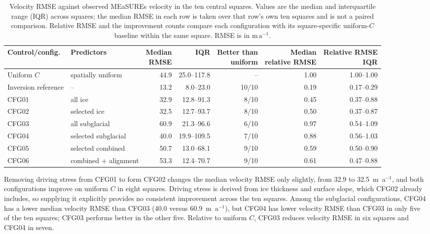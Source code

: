 \documentclass[review,jog]{igs}
\providecommand{\toprule}{\hline}
\providecommand{\midrule}{\hline}
\providecommand{\bottomrule}{\hline}
\begin{document}
\begin{table}
\caption{Velocity RMSE against observed MEaSUREs velocity in the ten central
squares. Values are the median and interquartile range (IQR) across squares; the median RMSE in each row is taken over that row's own ten squares and is not a paired comparison. Relative RMSE and the improvement counts compare each configuration with its square-specific uniform-$C$ baseline within the same square. RMSE is in
$\mathrm{m\,a^{-1}}$.}
\label{tab:performance_summary}
\centering\small
\ifdefined\FinalPass\setlength{\tabcolsep}{4pt}\fi
\begin{tabular}{llrrrrr}
\toprule
Control/config. & Predictors & \shortstack{Median\\RMSE} & IQR & \shortstack{Better than\\uniform} & \shortstack{Median\\relative RMSE} & \shortstack{Relative RMSE\\IQR}\\
\midrule
Uniform $C$ & spatially uniform & 44.9 & 25.0--117.8 &
-- & 1.00 & 1.00--1.00\\
Inversion reference & -- & 13.2 & 8.0--23.0 &
10/10 & 0.19 & 0.17--0.29\\
\midrule
CFG01 & all ice & 32.9 & 12.8--91.3 &
8/10 & 0.45 & 0.37--0.88\\
CFG02 & selected ice & 32.5 & 12.7--93.7 &
8/10 & 0.50 & 0.37--0.87\\
CFG03 & all subglacial & 60.9 & 21.3--96.6 &
6/10 & 0.97 & 0.54--1.09\\
CFG04 & selected subglacial & 40.0 & 19.9--109.5 &
7/10 & 0.88 & 0.56--1.03\\
CFG05 & selected combined & 50.7 & 13.0--68.1 &
9/10 & 0.59 & 0.50--0.90\\
CFG06 & combined + alignment & 53.3 & 12.4--70.7 &
9/10 & 0.61 & 0.47--0.88\\
\bottomrule
\end{tabular}
\end{table}

Removing driving stress from CFG01 to form CFG02 changes the median velocity
RMSE only slightly, from 32.9 to 32.5~m~a$^{-1}$, and both configurations
improve on uniform $C$ in eight squares. Driving stress is derived from ice thickness and surface slope, which CFG02 already includes, so supplying it explicitly provides no consistent improvement across the ten squares. Among the subglacial configurations, CFG04 has a lower median velocity RMSE than CFG03 (40.0 versus 60.9~m~a$^{-1}$), but CFG04 has lower velocity RMSE than CFG03 in only five of the ten squares; CFG03 performs better in the other five. Relative to uniform $C$, CFG03 reduces velocity RMSE in six squares and CFG04 in seven.
\end{document}
